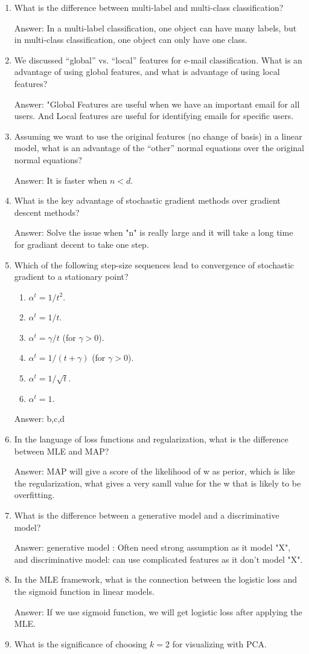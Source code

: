 \documentclass{article}
\def\ans#1{\par\gre{Answer: #1}}
\def\gre#1{{\color{gre}#1}}
\def\enum#1{\begin{enumerate}#1\end{enumerate}}
\begin{document}
\enum{
\item What is the difference between multi-label and multi-class classification?
\ans{In a multi-label classification, one object can have many labels, but in multi-class classification, one object can only have one class.}
\item We discussed ``global'' vs. ``local'' features for e-mail classification. What is an advantage of using global features, and what is advantage of using local features?
\ans{"Global Features are useful when we have an important email for all users. And Local features are useful for identifying emails for specific users.}
\item Assuming we want to use the original features (no change of basis) in a linear model, what is an advantage of the ``other'' normal equations over the original normal equations?
\ans{It is faster when $n<d$.}
\item What is the key advantage of stochastic gradient methods over gradient descent methods?
\ans{Solve the issue when "n" is really large and it will take a long time for gradiant decent to take one step.}
\item Which of the following step-size sequences lead to convergence of stochastic gradient to a stationary point?
\enum{
\item $\alpha^t = 1/t^2$.
\item $\alpha^t = 1/t$.
\item $\alpha^t = \gamma/t$ (for $\gamma > 0$).
\item $\alpha^t = 1/(t+\gamma)$ (for $\gamma > 0$).
\item $\alpha^t = 1/\sqrt{t}$.
\item $\alpha^t = 1$.
}
\ans{b,c,d}
\item In the language of loss functions and regularization, what is the difference between MLE and MAP?
\ans{MAP will give a score of the likelihood of w as perior, which is like the regularization, what gives a very samll value for the w that is likely to be overfitting. }
\item What is the difference between a generative model and a discriminative model?
\ans{generative model : Often need strong assumption as it model "X", and discriminative model: can use complicated features as it don't model "X".
}
\item In the MLE framework, what is the connection between the logistic loss and the sigmoid function in linear models.
\ans{If we use sigmoid function, we will get logistic loss after applying the MLE.}
\item What is the significance of choosing $k=2$ for visualizing with PCA.
}
\end{document}
